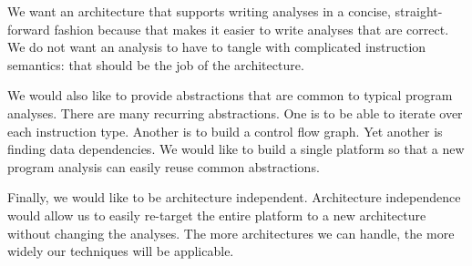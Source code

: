 We want an architecture that supports writing analyses in a concise,
straight-forward fashion because that makes it easier to write
analyses that are correct.  We do not want an analysis to have to
tangle with complicated instruction semantics: that should be the
job of the architecture.  

We would also like to provide abstractions that are common to typical
program analyses. There are many recurring abstractions. One is to be
able to iterate over each instruction type. Another is to build a
control flow graph.  Yet another is finding data dependencies. We
would like to build a single platform so that a new program analysis
can easily reuse common abstractions.

Finally, we would like to be architecture independent.  Architecture
independence would allow us to easily re-target the entire platform to
a new architecture without changing the analyses.  The more
architectures we can handle, the more widely our techniques will be
applicable.







